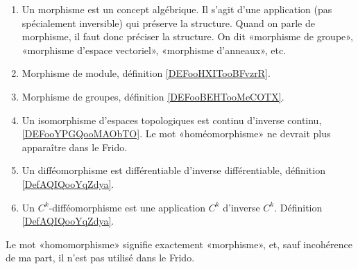 
\begin{enumerate}
	\item
	      Un morphisme est un concept algébrique. Il s'agit d'une application (pas spécialement inversible) qui préserve la structure. Quand on parle de morphisme, il faut donc préciser la structure. On dit «morphisme de groupe», «morphisme d'espace vectoriel», «morphisme d'anneaux», etc.
	\item
	      Morphisme de module, définition \ref{DEFooHXITooBFvzrR}.
      \item
          Morphisme de groupes, définition \ref{DEFooBEHTooMeCOTX}.
	\item
	      Un isomorphisme d'espaces topologiques est continu d'inverse continu, \ref{DEFooYPGQooMAObTO}. Le mot «homéomorphisme» ne devrait plus apparaître dans le Frido.
	\item
	      Un difféomorphisme est différentiable d'inverse différentiable, définition \ref{DefAQIQooYqZdya}.
	\item
	      Un \( C^k\)-difféomorphisme est une application \( C^k\) d'inverse \( C^k\). Définition \ref{DefAQIQooYqZdya}.
\end{enumerate}
Le mot «homomorphisme» signifie exactement «morphisme», et, sauf incohérence de ma part, il n'est pas utilisé dans le Frido.
